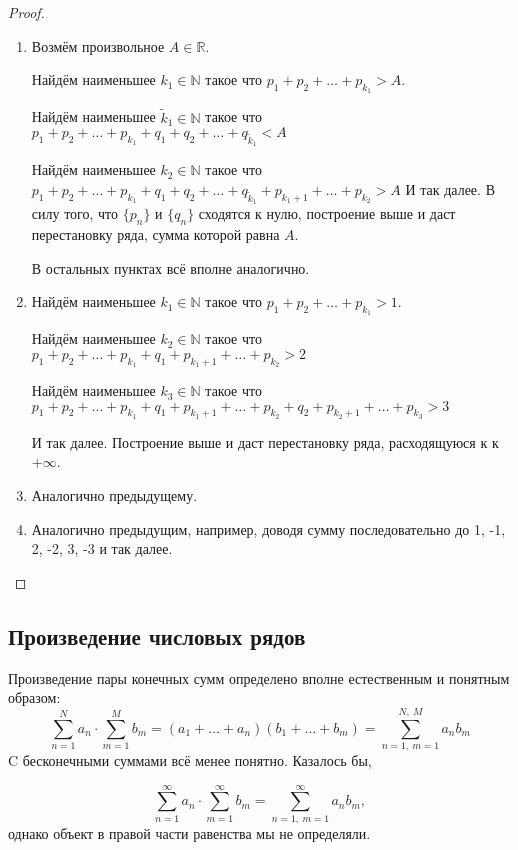 \documentclass[a4paper, 12pt]{article}
\begin{document}
	\begin{proof} \ 
		\begin{enumerate}
			\item Возмём произвольное $A \in \mathbb{R}$.  
			
			Найдём наименьшее $k_1 \in \mathbb{N}$ такое что $p_1+p_2+\dots+p_{k_1} > A$. 
			
			Найдём наименьшее $\tilde{k}_1 \in \mathbb{N}$ такое что $p_1+p_2+\dots+p_{k_1} + q_1+q_2 +\dots +q_{\tilde{k}_1} < A$ 
			
			Найдём наименьшее $k_2 \in \mathbb{N}$ такое что $p_1+p_2+\dots+p_{k_1} + q_1+q_2 +\dots +q_{\tilde{k}_1}+ p_{k_1+1}+\dots+p_{k_2} > A$ 
			И так далее. В силу того, что $\{p_n\}$ и $\{q_n\}$ сходятся к нулю, построение выше и даст перестановку ряда, сумма которой равна $A$.
			
			В остальных пунктах всё вполне аналогично.
			\item 
			Найдём наименьшее $k_1 \in \mathbb{N}$ такое что $p_1+p_2+\dots+p_{k_1} > 1$. 
			
			Найдём наименьшее $k_2 \in \mathbb{N}$ такое что $p_1+p_2+\dots+p_{k_1} + q_1+ p_{k_1+1}+\dots+p_{k_2} > 2$ 

			Найдём наименьшее $k_3 \in \mathbb{N}$ такое что $p_1+p_2+\dots+p_{k_1} + q_1+ p_{k_1+1}+\dots+p_{k_2} + q_2
			+ p_{k_2+1}+\dots+p_{k_3} > 3$ 

			И так далее. Построение выше и даст перестановку ряда, расходящуюся к к $+\infty$.
			\item Аналогично предыдущему.
			\item Аналогично предыдущим, например, доводя сумму последовательно до 1, -1, 2, -2, 3, -3 и так далее.
		\end{enumerate}
	\end{proof}

\subsection{Произведение числовых рядов}
	Произведение пары конечных сумм определено вполне естественным и понятным образом:
	\[
	\sum\limits_{n=1}^{N}a_n \cdot \sum\limits_{m=1}^{M}b_m = (a_1 + \dots + a_n) (b_1 + \dots + b_m)=\sum\limits_{n=1, \ m=1}^{N,\  M}a_nb_m
	\]
	C бесконечными суммами всё менее понятно. Казалось бы,
	
	\[
	\sum\limits_{n=1}^{\infty}a_n \cdot \sum\limits_{m=1}^{\infty}b_m = \sum\limits_{n=1, \ m=1}^{\infty}a_nb_m,
	\] однако объект в правой части равенства мы не определяли.
	
\end{document}
